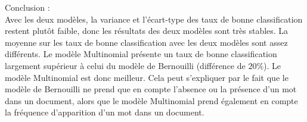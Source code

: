 \documentclass[a4paper, 12pt]{article}
\begin{document}
Conclusion : \\
Avec les deux modèles, la variance et l'écart-type des taux de bonne classification restent plutôt faible, donc les résultats des deux modèles sont très stables. La moyenne sur les taux de bonne classification avec les deux modèles sont assez différents. Le modèle Multinomial présente un taux de bonne classification largement supérieur à celui du modèle de Bernouilli (différence de $20\%$). Le modèle Multinomial est donc meilleur. Cela peut s'expliquer par le fait que le modèle de Bernouilli ne prend que en compte l'absence ou la présence d'un mot dans un document, alors que le modèle Multinomial prend également en compte la fréquence d'apparition d'un mot dans un document. 
\end{document}
